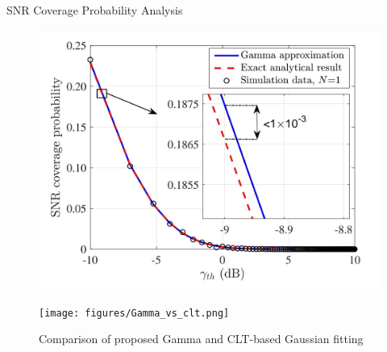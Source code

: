 \documentclass{beamer}
\begin{document}
\begin{frame}{SNR Coverage Probability Analysis}
    \begin{block}{}
        \begin{figure}
            \centering
            \includegraphics[scale = 0.1]{figures/result_gamma_approx_sim_with_exact_analysis.jpg}
            \caption{Results of the exact analysis, Gamma approximation, and simulation}
            \label{fig:exact_analysis}
            \centering
            \texttt{[image: figures/Gamma\_vs\_clt.png]}
            \caption{Comparison of proposed Gamma and CLT-based Gaussian fitting}
            \label{fig:Gamma_vs_clt}
        \end{figure}
    \end{block}
\end{frame}
\end{document}
